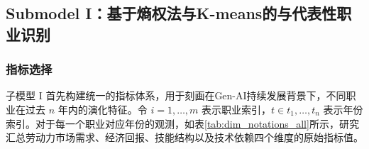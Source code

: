 \documentclass{mcmthesis}
\begin{document}
\subsection{Submodel I：基于熵权法与K-means的与代表性职业识别}

\subsubsection{指标选择}
\noindent 子模型 I 首先构建统一的指标体系，用于刻画在Gen-AI持续发展背景下，不同职业在过去 $n$ 年内的演化特征。令 $i = 1, \dots, m$ 表示职业索引，$t \in {t_1, \dots, t_n}$ 表示年份索引。对于每一个职业对应年份的观测，如表\ref{tab:dim_notations_all}所示，研究汇总劳动力市场需求、经济回报、技能结构以及技术依赖四个维度的原始指标值。



\newcommand{\DimHeader}[1]{%
  \noalign{\vskip 2pt}
  \cdashline{1-3}
  \noalign{\vskip 6pt}
  \multicolumn{3}{c}{\textbf{\textit{#1}}} \\
  \noalign{\vskip 6pt}
  \cdashline{1-3}
  \noalign{\vskip 2pt}
}

\captionsetup[table]{skip=12pt}
\end{document}
